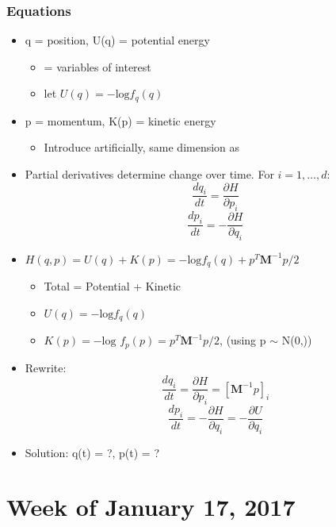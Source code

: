 \documentclass{article}
\begin{document}
\subsubsection{Equations}
\begin{itemize}
\item q = position, U(q) = potential energy 
      \begin{itemize}
      \item {} = variables of interest
      \item let $U(q) = -\text{log}f_{q}(q)$
      \end{itemize}
\item p = momentum, K(p) = kinetic energy
      \begin{itemize}
      \item Introduce artificially, same dimension as 
      \end{itemize}
\item Partial derivatives determine change over time. For $i = 1,\dots, d$:
$$ \frac{d q_{i}}{dt} = \frac{\partial H}{\partial p_{i}}$$
$$ \frac{d p_{i}}{dt} = -\frac{\partial H}{\partial q_{i}}$$

\item $H(q,p) = U(q) + K(p) = -\text{log}f_{q}(q) + p^{T}\pmb{M}^{-1}p/2$
    \begin{itemize}
    \item Total = Potential + Kinetic
    \item $U(q) = -\text{log}f_{q}(q)$
    \item $K(p) = -\text{log }f_{p}(p) = p^{T}\pmb{M}^{-1}p/2$, (using p $\sim$ N(0,))
    \end{itemize}
\item Rewrite:
$$ \frac{d q_{i}}{dt} = \frac{\partial H}{\partial p_{i}} = [\pmb{M}^{-1}p]_{i}$$
$$ \frac{d p_{i}}{dt} = -\frac{\partial H}{\partial q_{i}} =- \frac {\partial U}{\partial q_{i}} $$
\item Solution: q(t) = ?, p(t) = ?
\end{itemize}

\section*{Week of January 17, 2017} %
\end{document}
